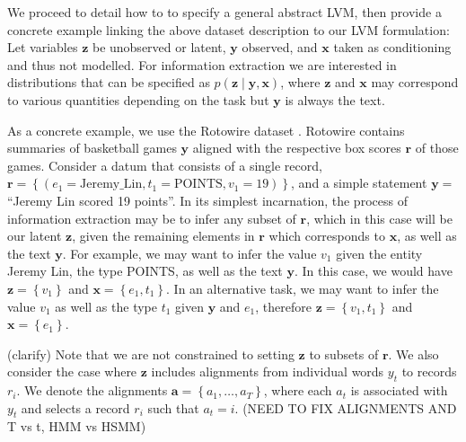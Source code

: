 \documentclass[11pt]{article}
\newcommand\set[1]{\left\{#1\right\}}
\newcommand{\ba}{\mathbf{a}}
\newcommand{\br}{\mathbf{r}}
\newcommand{\bx}{\mathbf{x}}
\newcommand{\by}{\mathbf{y}}
\newcommand{\bz}{\mathbf{z}}
\begin{document}
We proceed to detail how to to specify a general abstract LVM,
then provide a concrete example linking the above dataset description to our LVM formulation:
Let variables $\bz$ be unobserved or latent, $\by$ observed, and $\bx$ taken as conditioning
and thus not modelled.
For information extraction we are interested in distributions
that can be specified as $p(\bz\mid\by,\bx)$,
where $\bz$ and $\bx$ may correspond to various quantities depending on the task
but $\by$ is always the text.

As a concrete example, we use the Rotowire dataset \citep{wiseman2017d2t}.
Rotowire contains summaries of basketball games $\by$ aligned with the respective
box scores $\br$ of those games.
Consider a datum that consists of a single record,
$\br = \set{(e_1 = \textrm{Jeremy\_Lin}, t_1 = \textrm{POINTS}, v_1 = 19)}$,
and a simple statement $\by = $``Jeremy Lin scored 19 points''.
In its simplest incarnation, the process of information extraction may be to infer any
subset of $\br$, which in this case will be our latent $\bz$, given the remaining elements in $\br$
which corresponds to $\bx$, as well as the text $\by$.
For example, we may want to infer the value $v_1$ given 
the entity Jeremy Lin, the type POINTS, as well as the text $\by$.
In this case, we would have $\bz = \set{v_1}$ and $\bx = \set{e_1,t_1}$.
In an alternative task, we may want to infer the value $v_1$ 
as well as the type $t_1$ given $\by$ and $e_1$, therefore $\bz = \set{v_1,t_1}$ and $\bx=\set{e_1}$.

(clarify)
Note that we are not constrained to setting $\bz$ to subsets of $\br$.
We also consider the case where $\bz$ includes alignments from individual words $y_t$
to records $r_i$. We denote the alignments $\ba = \set{a_1,\ldots,a_T}$,
where each $a_t$ is associated with $y_t$ and selects a record $r_i$ such that $a_t = i$.
(NEED TO FIX ALIGNMENTS AND T vs t, HMM vs HSMM)
\end{document}
